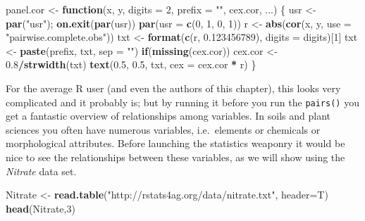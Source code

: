 \documentclass[letterpaper,]{book}
\newenvironment{Shaded}{\begin{snugshade}}{\end{snugshade}}
\newcommand{\ControlFlowTok}[1]{\textcolor[rgb]{0.13,0.29,0.53}{\textbf{#1}}}
\newcommand{\DataTypeTok}[1]{\textcolor[rgb]{0.13,0.29,0.53}{#1}}
\newcommand{\DecValTok}[1]{\textcolor[rgb]{0.00,0.00,0.81}{#1}}
\newcommand{\FloatTok}[1]{\textcolor[rgb]{0.00,0.00,0.81}{#1}}
\newcommand{\KeywordTok}[1]{\textcolor[rgb]{0.13,0.29,0.53}{\textbf{#1}}}
\newcommand{\NormalTok}[1]{#1}
\newcommand{\OperatorTok}[1]{\textcolor[rgb]{0.81,0.36,0.00}{\textbf{#1}}}
\newcommand{\StringTok}[1]{\textcolor[rgb]{0.31,0.60,0.02}{#1}}
\begin{document}
\begin{Shaded}
\begin{Highlighting}[]
\NormalTok{panel.cor <-}\StringTok{ }\ControlFlowTok{function}\NormalTok{(x, y, }\DataTypeTok{digits =} \DecValTok{2}\NormalTok{, }\DataTypeTok{prefix =} \StringTok{""}\NormalTok{, cex.cor, ...) \{}
\NormalTok{  usr <-}\StringTok{ }\KeywordTok{par}\NormalTok{(}\StringTok{"usr"}\NormalTok{); }\KeywordTok{on.exit}\NormalTok{(}\KeywordTok{par}\NormalTok{(usr))}
  \KeywordTok{par}\NormalTok{(}\DataTypeTok{usr =} \KeywordTok{c}\NormalTok{(}\DecValTok{0}\NormalTok{, }\DecValTok{1}\NormalTok{, }\DecValTok{0}\NormalTok{, }\DecValTok{1}\NormalTok{))}
\NormalTok{ r <-}\StringTok{ }\KeywordTok{abs}\NormalTok{(}\KeywordTok{cor}\NormalTok{(x, y, }\DataTypeTok{use =} \StringTok{"pairwise.complete.obs"}\NormalTok{))}
\NormalTok{  txt <-}\StringTok{ }\KeywordTok{format}\NormalTok{(}\KeywordTok{c}\NormalTok{(r, }\FloatTok{0.123456789}\NormalTok{), }\DataTypeTok{digits =}\NormalTok{ digits)[}\DecValTok{1}\NormalTok{]}
\NormalTok{  txt <-}\StringTok{ }\KeywordTok{paste}\NormalTok{(prefix, txt, }\DataTypeTok{sep =} \StringTok{""}\NormalTok{)}
  \ControlFlowTok{if}\NormalTok{(}\KeywordTok{missing}\NormalTok{(cex.cor)) cex.cor <-}\StringTok{ }\FloatTok{0.8}\OperatorTok{/}\KeywordTok{strwidth}\NormalTok{(txt)}
  \KeywordTok{text}\NormalTok{(}\FloatTok{0.5}\NormalTok{, }\FloatTok{0.5}\NormalTok{, txt, }\DataTypeTok{cex =}\NormalTok{ cex.cor }\OperatorTok{*}\StringTok{ }\NormalTok{r)}
\NormalTok{\}}
\end{Highlighting}
\end{Shaded}

For the average R user (and even the authors of this chapter), this looks very complicated and it probably is; but by running it before you run the \texttt{pairs()} you get a fantastic overview of relationships among variables. In soils and plant sciences you often have numerous variables, i.e.~elements or chemicals or morphological attributes. Before launching the statistics weaponry it would be nice to see the relationships between these variables, as we will show using the \emph{Nitrate} data set.

\begin{Shaded}
\begin{Highlighting}[]
\NormalTok{Nitrate <-}\StringTok{ }\KeywordTok{read.table}\NormalTok{(}\StringTok{"http://rstats4ag.org/data/nitrate.txt"}\NormalTok{, }\DataTypeTok{header=}\NormalTok{T)}
\KeywordTok{head}\NormalTok{(Nitrate,}\DecValTok{3}\NormalTok{)}
\end{Highlighting}
\end{Shaded}
\end{document}
